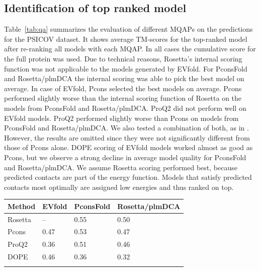 \documentclass{bioinfo}
\begin{document}
\subsection{Identification of top ranked model}
Table~\ref{tab:qa} summarizes the evaluation of different MQAPs on the
predictions for the PSICOV dataset. It shows average TM-scores for the
top-ranked model after re-ranking all models with each MQAP. In all
cases the cumulative score for the full protein was used. Due to
technical reasons, Rosetta's internal scoring function was not
applicable to the models generated by EVfold. For PconsFold and
Rosetta/plmDCA the internal scoring was able to pick the best model on
average. In case of EVfold, Pcons selected the best models on
average. Pcons performed slightly worse than the internal scoring
function of Rosetta on the models from PconsFold and
Rosetta/plmDCA. ProQ2 did not perform well on EVfold models. ProQ2 performed slightly worse than
Pcons on models from PconsFold and Rosetta/plmDCA. We also tested a
combination of both, as in \citeauthor{wallner_pcons.net:_2007}
\citeyear{wallner_pcons.net:_2007}. However, the results are omitted
since they were not significantly different from those of Pcons
alone. DOPE scoring of EVfold models worked almost as good as Pcons,
but we observe a strong decline in average model quality for PconsFold
and Rosetta/plmDCA. We assume Rosetta scoring performed best, because predicted contacts
are part of the energy function. Models that satisfy predicted
contacts most optimally are assigned low energies and thus ranked on top.

\begin{table}[!t]
{\begin{tabular}{llll}\toprule
Method & EVfold & PconsFold & Rosetta/plmDCA \\ \midrule
Rosetta & -- & 0.55 & 0.50 \\
Pcons & 0.47 & 0.53 & 0.47 \\
ProQ2 & 0.36 & 0.51 & 0.46 \\
DOPE & 0.46 & 0.36 & 0.32 \\ \botrule
\end{tabular}}{}
\end{table}
\end{document}
